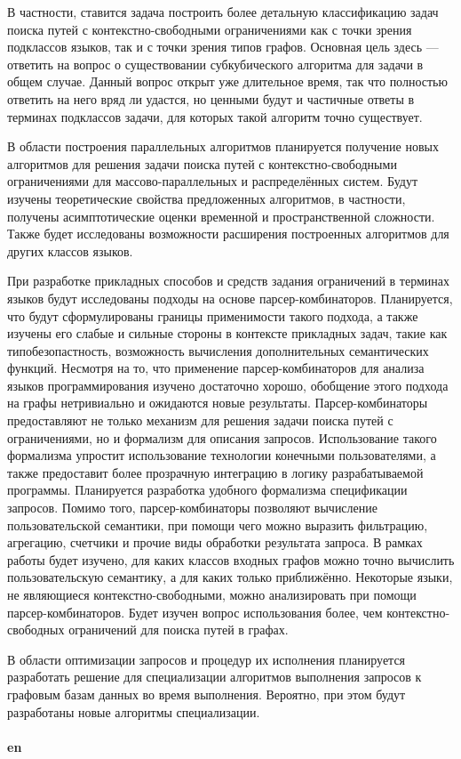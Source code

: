 \documentclass[12pt]{article}  %
\theoremstyle{remark}
\begin{document}
В частности, ставится задача построить более детальную классификацию задач поиска путей с контекстно-свободными ограничениями как с точки зрения подклассов языков, так и с точки зрения типов графов. Основная цель здесь — ответить на вопрос о существовании субкубического алгоритма для задачи в общем случае. Данный вопрос открыт уже длительное время, так что полностью ответить на него вряд ли удастся, но ценными будут и частичные ответы в терминах подклассов задачи, для которых такой алгоритм точно существует.

В области построения параллельных алгоритмов планируется получение новых алгоритмов для решения задачи поиска путей с контекстно-свободными ограничениями для массово-параллельных и распределённых систем. Будут изучены теоретические свойства предложенных алгоритмов, в частности, получены асимптотические оценки временной и пространственной сложности. Также будет исследованы возможности расширения построенных алгоритмов для других классов языков.

При разработке прикладных способов и средств задания ограничений в терминах языков будут исследованы подходы на основе парсер-комбинаторов. Планируется, что будут сформулированы границы применимости такого подхода, а также изучены его слабые и сильные стороны в контексте прикладных задач, такие как типобезопастность, возможность вычисления дополнительных семантических функций. Несмотря на то, что применение парсер-комбинаторов для анализа языков программирования изучено достаточно хорошо, обобщение этого подхода на графы нетривиально и ожидаются новые результаты. Парсер-комбинаторы предоставляют не только механизм для решения задачи поиска путей с ограничениями, но и формализм для описания запросов. Использование такого формализма упростит использование технологии конечными пользователями, а также предоставит более прозрачную интеграцию в логику разрабатываемой программы. Планируется разработка удобного формализма спецификации запросов. Помимо того, парсер-комбинаторы позволяют вычисление пользовательской семантики, при помощи чего можно выразить фильтрацию, агрегацию, счетчики и прочие виды обработки результата запроса. В рамках работы будет изучено, для каких классов входных графов можно точно вычислить пользовательскую семантику, а для каких только приближённо. Некоторые языки, не являющиеся контекстно-свободными, можно анализировать при помощи парсер-комбинаторов. Будет изучен вопрос использования более, чем контекстно-свободных ограничений для поиска путей в графах.

В области оптимизации запросов и процедур их исполнения планируется разработать решение для специализации алгоритмов выполнения запросов к графовым базам данных во время выполнения. Вероятно, при этом будут разработаны новые алгоритмы специализации.
\\
\\
\textbf{en}\\
\end{document}

